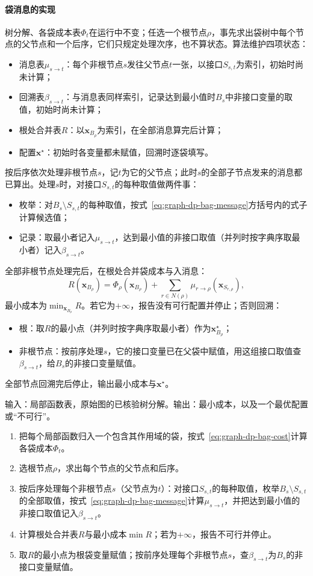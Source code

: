 \paragraph{袋消息的实现}
树分解、各袋成本表$\Phi_t$在运行中不变；任选一个根节点$\rho$，事先求出袋树中每个节点的父节点和一个后序，它们只规定处理次序，也不算状态。算法维护四项状态：
\begin{itemize}
  \item 消息表$\mu_{s\to t}$：每个非根节点$s$发往父节点$t$一张，以接口$S_{s,t}$为索引，初始时尚未计算；
  \item 回溯表$\beta_{s\to t}$：与消息表同样索引，记录达到最小值时$B_s$中非接口变量的取值，初始时尚未计算；
  \item 根处合并表$R$：以$\bm x_{B_\rho}$为索引，在全部消息算完后计算；
  \item 配置$\bm x^\star$：初始时各变量都未赋值，回溯时逐袋填写。
\end{itemize}
按后序依次处理非根节点$s$，记$t$为它的父节点；此时$s$的全部子节点发来的消息都已算出。处理$s$时，对接口$S_{s,t}$的每种取值做两件事：
\begin{itemize}
  \item 枚举：对$B_s\setminus S_{s,t}$的每种取值，按式~\eqref{eq:graph-dp-bag-message}方括号内的式子计算候选值；
  \item 记录：取最小者记入$\mu_{s\to t}$，达到最小值的非接口取值（并列时按字典序取最小者）记入$\beta_{s\to t}$。
\end{itemize}
全部非根节点处理完后，在根处合并袋成本与入消息：
\[
R(\bm x_{B_\rho})=\Phi_\rho(\bm x_{B_\rho})+\sum_{r\in N(\rho)}\mu_{r\to\rho}(\bm x_{S_{r,\rho}}),
\]
最小成本为$\min_{\bm x_{B_\rho}}R$。若它为$+\infty$，报告没有可行配置并停止；否则回溯：
\begin{itemize}
  \item 根：取$R$的最小点（并列时按字典序取最小者）作为$\bm x^\star_{B_\rho}$；
  \item 非根节点：按前序处理$s$，它的接口变量已在父袋中赋值，用这组接口取值查$\beta_{s\to t}$，给$B_s$的非接口变量赋值。
\end{itemize}
全部节点回溯完后停止，输出最小成本与$\bm x^\star$。

\begin{algorithm}[树分解上的动态规划]
\label{alg:graph-dp-bag-dp}
输入：局部函数表，原始图的已核验树分解。输出：最小成本，以及一个最优配置或“不可行”。
\begin{enumerate}
  \item 把每个局部函数归入一个包含其作用域的袋，按式~\eqref{eq:graph-dp-bag-cost}计算各袋成本$\Phi_t$。
  \item 选根节点$\rho$，求出每个节点的父节点和后序。
  \item 按后序处理每个非根节点$s$（父节点为$t$）：对接口$S_{s,t}$的每种取值，枚举$B_s\setminus S_{s,t}$的全部取值，按式~\eqref{eq:graph-dp-bag-message}计算$\mu_{s\to t}$，并把达到最小值的非接口取值记入$\beta_{s\to t}$。
  \item 计算根处合并表$R$与最小成本$\min R$；若为$+\infty$，报告不可行并停止。
  \item 取$R$的最小点为根袋变量赋值；按前序处理每个非根节点$s$，查$\beta_{s\to t}$为$B_s$的非接口变量赋值。
\end{enumerate}
\end{algorithm}

